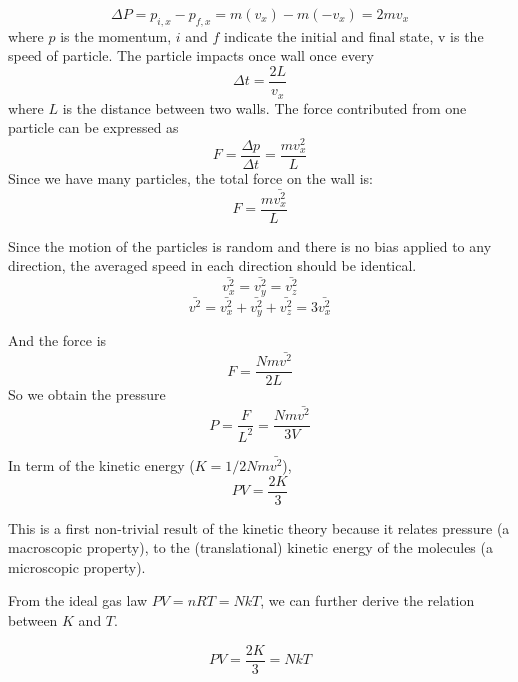 \begin{equation} \Delta P = p_{i,x} - p_{f,x} = m(v_x) - m(-v_x) = 2mv_x \end{equation}
where $p$ is the momentum, $i$ and $f$ indicate the initial and final state, v is the speed of particle.
The particle impacts once wall once every
\begin{equation} \Delta t = \frac{2L}{v_x} \end{equation}
where $L$ is the distance between two walls.
The force contributed from one particle can be expressed as 
\begin{equation} F = \frac{\Delta p}{\Delta t} = \frac{mv_x^2}{L}\end{equation}
Since we have many particles, the total force on the wall is:
\begin{equation} F = \frac{m\bar{v_x^2}}{L}\end{equation}

Since the motion of the particles is random and there is no bias applied to any direction, the averaged speed in each direction should be identical.
\begin{equation} \bar{v_x^2} = \bar{v_y^2} = \bar{v_z^2}  \end{equation}
\begin{equation} \bar{v^2} = \bar{v_x^2} + \bar{v_y^2} + \bar{v_z^2} = 3\bar{v_x^2} \end{equation}

And the force is
\begin{equation} F = \frac{Nm\bar{v^2}}{2L} \end{equation}
So we obtain the pressure
\begin{equation} P = \frac{F}{L^2} = \frac{Nm\bar{v^2}}{3V} \end{equation}

In term of the kinetic energy ($K=1/2Nm\bar{v^2}$),
\begin{equation} PV = \frac{2K}{3} \end{equation}

This is a first non-trivial result of the kinetic theory because it relates pressure (a macroscopic property), to the (translational) kinetic energy of the molecules (a microscopic property).

From the ideal gas law $PV=nRT=NkT$, we can further derive the relation between $K$ and $T$.

\begin{equation} PV = \frac{2K}{3} = NkT \end{equation}

